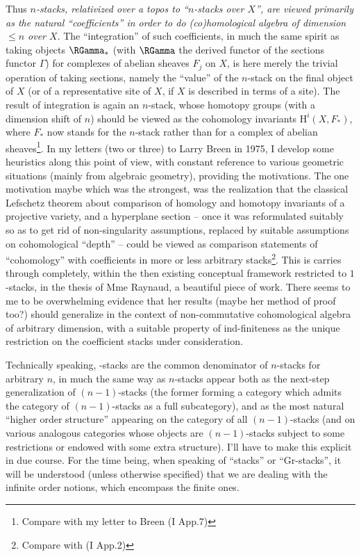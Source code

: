 Thus \emph{$n$-stacks, relativized over a topos to ``$n$-stacks over $X$'',
are viewed primarily as the natural ``coefficients'' in order to do
(co)homological algebra of dimension $\le n$ over $X$}. The
``integration'' of such coefficients, in much the same spirit as
taking objects $\RGamma_*$ (with $\RGamma$ the derived functor of the
sections functor $\Gamma$) for complexes of abelian sheaves $F_j$ on
$X$, is here merely the trivial operation of taking sections, namely
the ``value'' of the $n$-stack on the final object of $X$ (or of a
representative site of $X$, if $X$ is described in terms of a
site). The result of integration is again an $n$-stack, whose homotopy
groups (with a dimension shift of $n$) should be viewed as the
cohomology invariants $\mathrm H^i(X,F_*)$, where $F_*$ now stands for the
$n$-stack rather than for a complex of abelian sheaves\footnote{Compare with my letter to Breen (I App.7)}. In my letters
(two or three) to Larry Breen in 1975, I develop some heuristics along
this point of view, with constant reference to various geometric
situations (mainly from algebraic geometry), providing the
motivations. The one motivation maybe which was the strongest, was the
realization that the classical Lefschetz theorem about comparison of
homology and homotopy invariants of a projective variety, and a
hyperplane section -- once it was reformulated suitably so as to get
rid of non-singularity assumptions, replaced by suitable assumptions
on cohomological ``depth'' -- could be viewed as comparison statements
of ``cohomology'' with coefficients in more or less arbitrary
stacks\footnote{Compare with (I App.2)}. This is carries through completely, within the then existing
conceptual framework restricted to $1$-stacks, in the thesis of Mme
Raynaud, a beautiful piece of work. There seems to me to be
overwhelming evidence that her results (maybe her method of proof
too?) should generalize in the context of non-commutative
cohomological algebra of arbitrary dimension, with a suitable property
of ind-finiteness as the unique restriction on the
coefficient stacks under consideration.

Technically speaking, \oo-stacks are the common denominator of
$n$-stacks for arbitrary $n$, in much the same way as $n$-stacks
appear both as the next-step generalization of $(n-1)$-stacks (the
former forming a category which admits the category of $(n-1)$-stacks
as a full subcategory), and as the most natural ``higher order
structure'' appearing on the category of all $(n-1)$-stacks (and on
various analogous categories whose objects are $(n-1)$-stacks subject
to some restrictions or endowed with some extra structure). I'll have
to make this explicit in due course. For the time being, when speaking
of ``stacks'' or ``Gr-stacks'', it will be understood (unless
otherwise specified) that we are dealing with the infinite order
notions, which encompass the finite ones.

